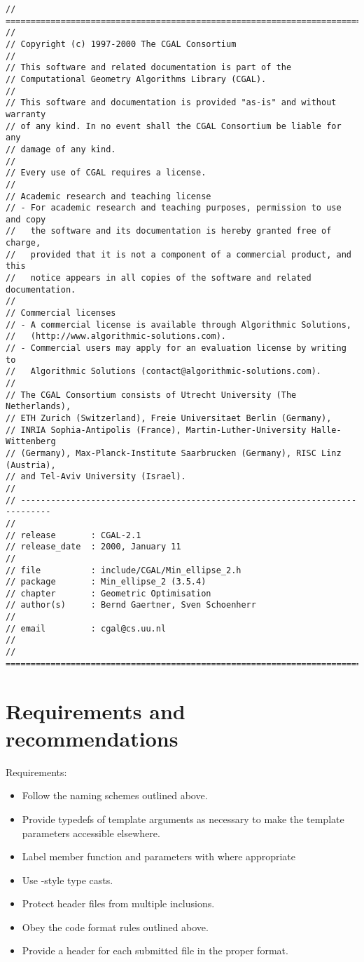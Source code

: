 \begin{verbatim}
// ============================================================================
//
// Copyright (c) 1997-2000 The CGAL Consortium
//
// This software and related documentation is part of the
// Computational Geometry Algorithms Library (CGAL).
//
// This software and documentation is provided "as-is" and without warranty
// of any kind. In no event shall the CGAL Consortium be liable for any
// damage of any kind.
//
// Every use of CGAL requires a license. 
//
// Academic research and teaching license
// - For academic research and teaching purposes, permission to use and copy
//   the software and its documentation is hereby granted free of charge,
//   provided that it is not a component of a commercial product, and this
//   notice appears in all copies of the software and related documentation. 
//
// Commercial licenses
// - A commercial license is available through Algorithmic Solutions,
//   (http://www.algorithmic-solutions.com). 
// - Commercial users may apply for an evaluation license by writing to
//   Algorithmic Solutions (contact@algorithmic-solutions.com).
//
// The CGAL Consortium consists of Utrecht University (The Netherlands),
// ETH Zurich (Switzerland), Freie Universitaet Berlin (Germany),
// INRIA Sophia-Antipolis (France), Martin-Luther-University Halle-Wittenberg
// (Germany), Max-Planck-Institute Saarbrucken (Germany), RISC Linz (Austria),
// and Tel-Aviv University (Israel).
//
// ----------------------------------------------------------------------------
//
// release       : CGAL-2.1
// release_date  : 2000, January 11
//
// file          : include/CGAL/Min_ellipse_2.h
// package       : Min_ellipse_2 (3.5.4)
// chapter       : Geometric Optimisation
// author(s)     : Bernd Gaertner, Sven Schoenherr
//
// email         : cgal@cs.uu.nl
//
// ============================================================================
\end{verbatim}


\section{Requirements and recommendations}
\label{sec:code_format_doc_req_and_rec}

\noindent
Requirements:
\begin{itemize}
   \item Follow the naming schemes outlined above.
   \item Provide typedefs of template arguments as necessary to make the
         template parameters accessible elsewhere.
   \item Label member function and parameters with  where 
         appropriate
   \item Use \CC-style type casts.
   \item Protect header files from multiple inclusions.
   \item Obey the code format rules outlined above.
   \item Provide a header for each submitted file in the proper format.
\end{itemize}
